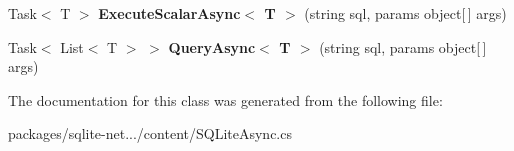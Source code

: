 \begin{DoxyCompactItemize}
\item 
\hypertarget{classSQLite_1_1SQLiteAsyncConnection_adae67f753b244b754cc33be48cafbf67}{}Task$<$ T $>$ {\bfseries Execute\+Scalar\+Async$<$ T $>$} (string sql, params object\mbox{[}$\,$\mbox{]} args)\label{classSQLite_1_1SQLiteAsyncConnection_adae67f753b244b754cc33be48cafbf67}

\item 
\hypertarget{classSQLite_1_1SQLiteAsyncConnection_a8a81a54a5769d761562d9a3ce18b0f57}{}Task$<$ List$<$ T $>$ $>$ {\bfseries Query\+Async$<$ T $>$} (string sql, params object\mbox{[}$\,$\mbox{]} args)\label{classSQLite_1_1SQLiteAsyncConnection_a8a81a54a5769d761562d9a3ce18b0f57}

\end{DoxyCompactItemize}


The documentation for this class was generated from the following file\+:\begin{DoxyCompactItemize}
\item 
packages/sqlite-\/net.../content/S\+Q\+Lite\+Async.\+cs\end{DoxyCompactItemize}
